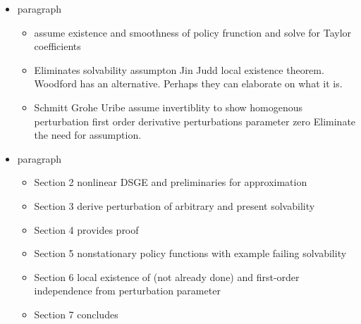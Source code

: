 \documentclass[12pt]{article}
\begin{document}
\begin{itemize}
\item paragraph

\begin{itemize}
\item assume existence and smoothness of policy frunction and solve for Taylor coefficients
\item Eliminates solvability assumpton Jin Judd local existence theorem. Woodford has an alternative. Perhaps they  can elaborate on what it is.
\item Schmitt Grohe Uribe assume invertiblity to show homogenous perturbation first order derivative  perturbations parameter zero  Eliminate the need for assumption.
\end{itemize}
\item paragraph

\begin{itemize}
\item Section 2 nonlinear DSGE and preliminaries for approximation
\item Section 3 derive perturbation of arbitrary and present solvability
\item Section 4 provides proof
\item Section 5 nonstationary policy functions with example failing solvability
\item Section 6 local existence of  (not already done) and first-order independence from perturbation parameter
\item Section 7 concludes
\end{itemize}



\end{itemize}
\end{document}
